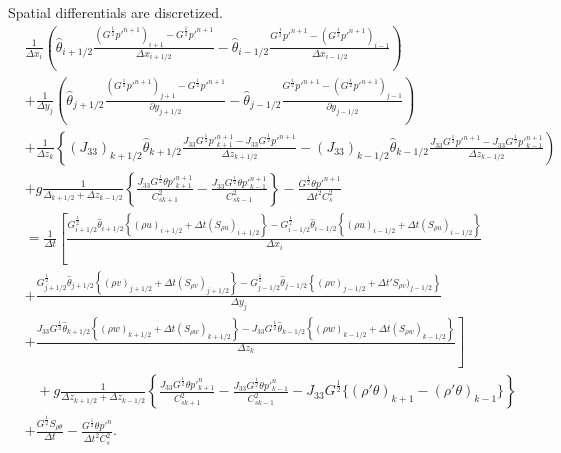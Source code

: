 Spatial differentials are discretized.
\begin{align}
  & \frac{1}{\Delta x_i}\left(
   \hat{\theta}_{i+1/2}\frac{(G^{\frac{1}{2}}p'^{n+1})_{i+1}-G^{\frac{1}{2}}p'^{n+1}}{\Delta x_{i+1/2}}
  -\hat{\theta}_{i-1/2}\frac{G^{\frac{1}{2}}p'^{n+1}-(G^{\frac{1}{2}}p'^{n+1})_{i-1}}{\Delta x_{i-1/2}}
  \right) \nonumber\\&
  + \frac{1}{\Delta y_j}\left(
   \hat{\theta}_{j+1/2}\frac{(G^{\frac{1}{2}}p'^{n+1})_{j+1}-G^{\frac{1}{2}}p'^{n+1}}{\partial y_{j+1/2}}
  -\hat{\theta}_{j-1/2}\frac{G^{\frac{1}{2}}p'^{n+1}-(G^{\frac{1}{2}}p'^{n+1})_{j-1}}{\partial y_{j-1/2}}
 \right) \nonumber\\&
  + \frac{1}{\Delta z_k}\left\{
   (J_{33})_{k+1/2}\hat{\theta}_{k+1/2}\frac{J_{33}G^{\frac{1}{2}}p'^{n+1}_{k+1}-J_{33}G^{\frac{1}{2}}p'^{n+1}}{\Delta z_{k+1/2}}
  -(J_{33})_{k-1/2}\hat{\theta}_{k-1/2}\frac{J_{33}G^{\frac{1}{2}}p'^{n+1}-J_{33}G^{\frac{1}{2}}p'^{n+1}_{k-1}}{\Delta z_{k-1/2}}
  \right) \nonumber\\&
  + g \frac{1}{\Delta_{k+1/2}+\Delta z_{k-1/2}} \left\{
   \frac{J_{33}G^{\frac{1}{2}}\theta p'^{n+1}_{k+1}}{C^2_{s k+1}}
  -\frac{J_{33}G^{\frac{1}{2}}\theta p'^{n+1}_{k-1}}{C^2_{s k-1}} \right\}
  - \frac{G^{\frac{1}{2}}\theta p'^{n+1}}{\Delta t^2 C^2_s} \nonumber\\
  &=
  \frac{1}{\Delta t}\left[
      \frac{
         G^{\frac{1}{2}}_{i+1/2}\hat{\theta}_{i+1/2}\left\{(\rho u)_{i+1/2} + \Delta t (S_{\rho u})_{i+1/2}\right\}
        -G^{\frac{1}{2}}_{i-1/2}\hat{\theta}_{i-1/2}\left\{(\rho u)_{i-1/2} + \Delta t (S_{\rho u})_{i-1/2}\right\}
      }{\Delta x_i} \right.\nonumber\\&
    + \frac{
        G^{\frac{1}{2}}_{j+1/2}\hat{\theta}_{j+1/2}\left\{(\rho v)_{j+1/2} + \Delta t (S_{\rho v})_{j+1/2}\right\}
       -G^{\frac{1}{2}}_{j-1/2}\hat{\theta}_{j-1/2}\left\{(\rho v)_{j-1/2} + \Delta t 'S_{\rho v})_{j-1/2}\right\}
      }{\Delta y_j} \nonumber\\& \left.
    + \frac{
        J_{33}G^{\frac{1}{2}}\hat{\theta}_{k+1/2}\left\{(\rho w)_{k+1/2} + \Delta t (S_{\rho w})_{k+1/2}\right\}
       -J_{33}G^{\frac{1}{2}}\hat{\theta}_{k-1/2}\left\{(\rho w)_{k-1/2} + \Delta t (S_{\rho w})_{k-1/2}\right\}
      }{\Delta z_k}
    \right] \nonumber\\&\;\;\;
  + g \frac{1}{\Delta z_{k+1/2}+\Delta z_{k-1/2}}\left\{
    \frac{J_{33}G^{\frac{1}{2}}\theta p'^n_{k+1}}{C^2_{s k+1}}
   -\frac{J_{33}G^{\frac{1}{2}}\theta p'^n_{k-1}}{C^2_{s k-1}}
   - J_{33}G^{\frac{1}{2}} \{(\rho'\theta)_{k+1} - (\rho'\theta)_{k-1}\}
  \right\} \nonumber\\&
  + \frac{G^{\frac{1}{2}} S_{\rho\theta}}{\Delta t}
  - \frac{G^{\frac{1}{2}}\theta p'^n}{\Delta t^2 C^2_s}.
\end{align}
